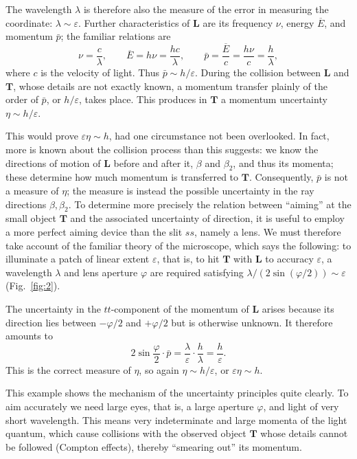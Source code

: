 \documentclass[fontsize=13pt,twoside,openany,headings=normal,parskip=false,bookmarkpackage=false,DIV=calc]{scrbook}
\begin{document}
The wavelength $\lambda$ is therefore also the measure of the error in measuring the coordinate: $\lambda\sim\varepsilon$. Further characteristics of $\boldsymbol{L}$ are its frequency $\nu$, energy $\overline E$, and momentum $\bar p$; the familiar relations are
\[
\nu=\frac c\lambda,\qquad
\overline E=h\nu=\frac{hc}\lambda,\qquad
\bar p=\frac{\overline E}c=\frac{h\nu}c=\frac h\lambda,
\]
where $c$ is the velocity of light. Thus $\bar p\sim h/\varepsilon$. During the collision between $\boldsymbol{L}$ and $\boldsymbol{T}$, whose details are not exactly known, a momentum transfer plainly of the order of $\bar p$, or $h/\varepsilon$, takes place. This produces in $\boldsymbol{T}$ a momentum uncertainty $\eta\sim h/\varepsilon$.

This would prove $\varepsilon\eta\sim h$, had one circumstance not been overlooked. In fact, more is known about the collision process than this suggests:
\hypertarget{origpage-128}{}%
we know the directions of motion of $\boldsymbol{L}$ before and after it, $\beta$ and $\beta_2$, and thus its momenta; these determine how much momentum is transferred to $\boldsymbol{T}$. Consequently, $\bar p$ is not a measure of $\eta$; the measure is instead the possible uncertainty in the ray directions $\beta,\beta_2$. To determine more precisely the relation between ``aiming'' at the small object $\boldsymbol{T}$ and the associated uncertainty of direction, it is useful to employ a more perfect aiming device than the slit $ss$, namely a lens. We must therefore take account of the familiar theory of the microscope, which says the following: to illuminate a patch of linear extent $\varepsilon$, that is, to hit $\boldsymbol{T}$ with $\boldsymbol{L}$ to accuracy $\varepsilon$, a wavelength $\lambda$ and lens aperture $\varphi$ are required satisfying $\lambda/(2\sin(\varphi/2))\sim\varepsilon$ (Fig.~\ref{fig:2}).

The uncertainty in the $tt$-component of the momentum of $\boldsymbol{L}$ arises because its direction lies between $-\varphi/2$ and $+\varphi/2$ but is otherwise unknown. It therefore amounts to
\[
2\sin\frac\varphi2\cdot\bar p=\frac\lambda\varepsilon\cdot\frac h\lambda=\frac h\varepsilon.
\]
This is the correct measure of $\eta$, so again $\eta\sim h/\varepsilon$, or $\varepsilon\eta\sim h$.

This example shows the mechanism of the uncertainty principles quite clearly. To aim accurately we need large eyes, that is, a large aperture $\varphi$, and light of very short wavelength. This means very indeterminate and large momenta of the light quantum, which cause collisions with the observed object $\boldsymbol{T}$ whose details cannot be followed (Compton effects), thereby ``smearing out'' its momentum.
\end{document}
